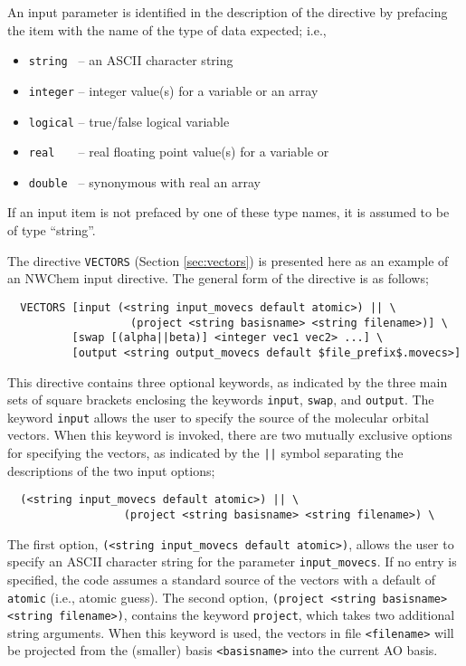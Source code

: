 \fussy

An input parameter is identified in the description of the directive
by prefacing the item with the name of the type of data expected;
i.e.,

\begin{itemize}
\item \verb+string +  -- an ASCII character string
\item \verb+integer+ --  integer value(s) for a variable or an array
\item \verb+logical+ --  true/false logical variable
\item \verb+real   +  -- real floating point value(s) for a variable or 
\item \verb+double + -- synonymous with real
an array
\end{itemize}

If an input item is not prefaced by one of these type names,
it is assumed to be of type ``string''.
 
The directive \verb+VECTORS+ (Section \ref{sec:vectors}) is presented here
as an example of an NWChem input directive.  The general form of the
directive is as follows;
\begin{verbatim}
  VECTORS [input (<string input_movecs default atomic>) || \
                   (project <string basisname> <string filename>)] \
          [swap [(alpha||beta)] <integer vec1 vec2> ...] \
          [output <string output_movecs default $file_prefix$.movecs>]
\end{verbatim}

This directive contains three optional keywords, as indicated by the 
three main sets of square brackets enclosing the keywords \verb+input+,
\verb+swap+, and \verb+output+.  The keyword \verb+input+ allows the
user to specify the source of the molecular orbital vectors.  When
this keyword is invoked, there are two mutually exclusive options for
specifying the vectors, as indicated by the \verb+||+ symbol
separating the descriptions of the two input options;

\begin{verbatim}
  (<string input_movecs default atomic>) || \
                  (project <string basisname> <string filename>) \
\end{verbatim}

The first option, \verb+(<string input_movecs default atomic>)+,
allows the user to specify an ASCII character string for the parameter
{\tt input\_movecs}.  If no entry is specified, the code assumes a
standard source of the vectors with a default of \verb+atomic+ (i.e.,
atomic guess).  The second option, {\tt(project <string basisname>
  <string filename>)}, contains the keyword \verb+project+, which
takes two additional string arguments.  When this keyword is used, the
vectors in file \verb+<filename>+ will be projected from the (smaller)
basis \verb+<basisname>+ into the current AO basis.

